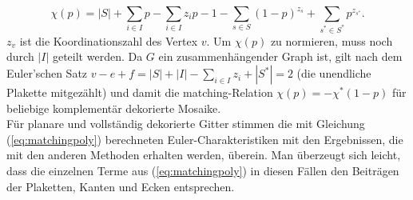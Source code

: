 \begin{equation}
  \chi(p)=|S|+\sum_{i\in I} p-\sum_{i\in I} z_i p-1 -\sum_{s \in S}(1-p)^{z_s}+\sum_{s^* \in S^*}p^{z_{s^*}}.
  \label{eq:matchingpoly}
\end{equation}
$z_v$ ist die Koordinationszahl des Vertex $v$. Um $\chi(p)$ zu normieren, muss noch durch $|I|$ geteilt werden. Da $G$ ein zusammenh\"angender Graph ist, gilt nach dem Euler'schen Satz $v-e+f=|S|+|I|-\sum_{i\in I}z_i +|S^*|=2$ (die unendliche Plakette mitgez\"ahlt) und damit die matching-Relation $\chi(p)=-\chi^*(1-p)$ f\"ur beliebige komplement\"ar dekorierte Mosaike.
\\F\"ur planare und vollst\"andig dekorierte Gitter stimmen die mit Gleichung (\ref{eq:matchingpoly}) berechneten Euler-Charakteristiken mit den Ergebnissen, die mit den anderen Methoden erhalten werden, \"uberein. Man \"uberzeugt sich leicht, dass die einzelnen Terme aus (\ref{eq:matchingpoly}) in diesen F\"allen den Beitr\"agen der Plaketten, Kanten und Ecken entsprechen. 

